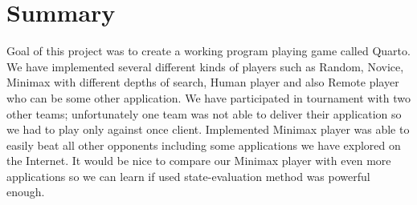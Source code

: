 \documentclass[paper=a4, fontsize=11pt]{article} %
\begin{document}
\section{Summary}
Goal of this project was to create a working program playing game called Quarto.
We have implemented several different kinds of players such as Random, Novice, Minimax with different depths of search, Human player and also Remote player who can be some other application. 
We have participated in tournament with two other teams; unfortunately one team was not able to deliver their application so we had to play only against once client. 
Implemented Minimax player was able to easily beat all other opponents including some applications we have explored on the Internet. 
It would be nice to compare our Minimax player with even more applications so we can learn if used state-evaluation method was powerful enough.

\begin{flushleft}
%
\end{flushleft}
\end{document}
